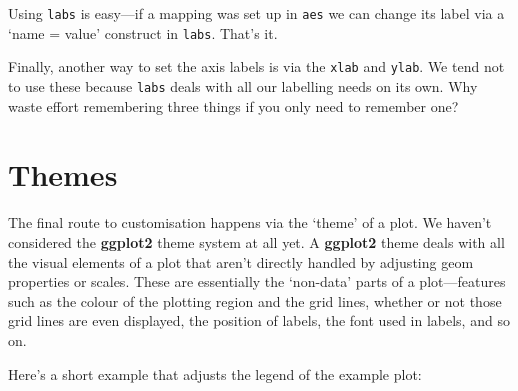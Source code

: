 \documentclass[
]{book}
\begin{document}
Using \texttt{labs} is easy---if a mapping was set up in \texttt{aes} we can change its label via a `name = value' construct in \texttt{labs}. That's it.

Finally, another way to set the axis labels is via the \texttt{xlab} and \texttt{ylab}. We tend not to use these because \texttt{labs} deals with all our labelling needs on its own. Why waste effort remembering three things if you only need to remember one?

\hypertarget{themes}{%
\section{Themes}\label{themes}}

The final route to customisation happens via the `theme' of a plot. We haven't considered the \textbf{ggplot2} theme system at all yet. A \textbf{ggplot2} theme deals with all the visual elements of a plot that aren't directly handled by adjusting geom properties or scales. These are essentially the `non-data' parts of a plot---features such as the colour of the plotting region and the grid lines, whether or not those grid lines are even displayed, the position of labels, the font used in labels, and so on.

Here's a short example that adjusts the legend of the example plot:
\end{document}
